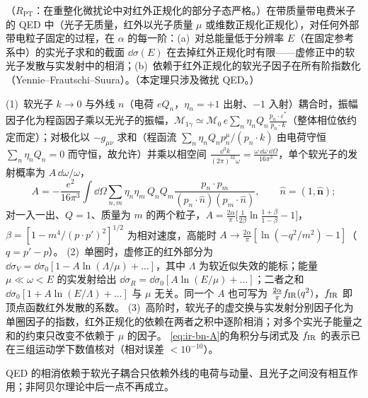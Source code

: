 \begin{theorem}\label{thm:ir-bn-qed}
（$R_{\mathrm{PT}}$：在重整化微扰论中对红外正规化的部分子态严格。）在带质量带电费米子的 QED 中（光子无质量，红外以光子质量 $\mu$ 或维数正规化正规化），对任何外部带电粒子固定的过程，在 $\alpha$ 的每一阶：(a)~对总能量低于分辨率 $E$（在固定参考系中）的实光子求和的截面 $\dd\sigma(E)$ 在去掉红外正规化时有限——虚修正中的软光子发散与实发射中的相消；(b)~依赖于红外正规化的软光子因子在所有阶指数化（Yennie--Frautschi--Suura）。（本定理只涉及微扰 QED。）
\end{theorem}
\begin{proofsketch}
(1)~软光子 $k\to0$ 与外线 $n$（电荷 $eQ_n$，$\eta_n=+1$ 出射、$-1$ 入射）耦合时，振幅因子化为程函因子乘以无光子的振幅，$\mathcal M_{1\gamma}\simeq\mathcal M_0\,e\sum_n\eta_nQ_n\frac{p_n\cdot\varepsilon^*}{p_n\cdot k}$（整体相位依约定而定）；对极化以 $-g_{\mu\nu}$ 求和（程函流 $\sum_n\eta_nQ_np_n^\mu/(p_n\cdot k)$ 由电荷守恒 $\sum_n\eta_nQ_n=0$ 而守恒，故允许）并乘以相空间 $\frac{\dd^3k}{(2\pi)^32\omega}=\frac{\omega\,\dd\omega\,\dd\Omega}{16\pi^3}$，单个软光子的发射概率为 $A\,\dd\omega/\omega$，
\begin{equation}\label{eq:ir-bn-A}
A=-\frac{e^2}{16\pi^3}\int\dd\Omega\sum_{n,m}\eta_n\eta_m\,Q_nQ_m\frac{p_n\cdot p_m}{(p_n\cdot\hat n)(p_m\cdot\hat n)},\qquad \hat n=(1,\hat{\mathbf n});
\end{equation}
对一入一出、$Q=1$、质量为 $m$ 的两个粒子，$A=\frac{2\alpha}{\pi}\big[\frac{1}{2\beta}\ln\frac{1+\beta}{1-\beta}-1\big]$，$\beta=[1-m^4/(p\cdot p')^2]^{1/2}$ 为相对速度，高能时 $A\to\frac{2\alpha}{\pi}[\ln(-q^2/m^2)-1]$（$q=p'-p$）。
(2)~单圈时，虚修正的红外部分为 $\dd\sigma_V=\dd\sigma_0[1-A\ln(\Lambda/\mu)+\dots]$，其中 $\Lambda$ 为软近似失效的能标；能量 $\mu\ll\omega<E$ 的实发射给出 $\dd\sigma_R=\dd\sigma_0[A\ln(E/\mu)+\dots]$；二者之和 $\dd\sigma_0[1+A\ln(E/\Lambda)+\dots]$ 与 $\mu$ 无关。同一个 $A$ 也可写为 $\frac{2\alpha}{\pi}f_{\rm IR}(q^2)$，$f_{\rm IR}$ 即顶点函数红外发散的系数\cite[第~6.4--6.5~节]{PeskinSchroeder1995}。
(3)~高阶时，软光子的虚交换与实发射分别因子化为单圈因子的指数，红外正规化的依赖在两者之积中逐阶相消；对多个实光子能量之和的约束只改变不依赖于 $\mu$ 的因子\cite{BlochNordsieck1937,YennieFrautschiSuura1961,Weinberg1965}。
\cref{eq:ir-bn-A}的角积分与闭式及 $f_{\rm IR}$ 的表示已在三组运动学下数值核对（相对误差 $<10^{-10}$）。
\end{proofsketch}

QED 的相消依赖于软光子耦合只依赖外线的电荷与动量、且光子之间没有相互作用；非阿贝尔理论中后一点不再成立。

